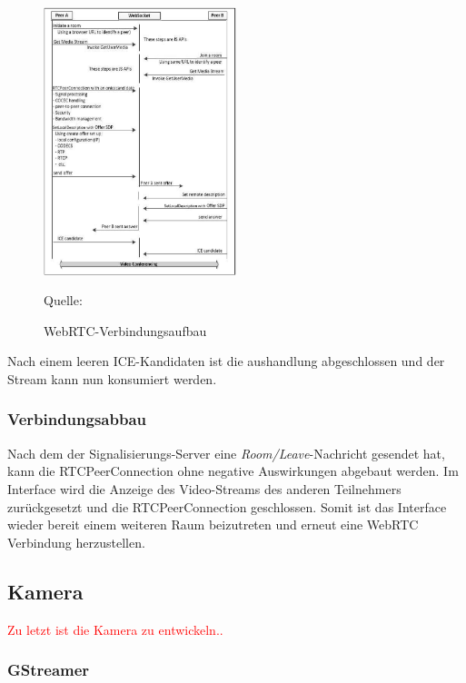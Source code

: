 \documentclass{article}
\newcommand{\figuresource}[1]{
	\begin{center}Quelle: #1\end{center}
}
\begin{document}
\begin{onecolumn}

\begin{figure}[ht]
	\includegraphics[width=0.5\textwidth]{cited-webrtc-connection-establishment}
	\centering
	\caption[WebRTC-Verbindungsaufbau~\cite{WebRTC}]{WebRTC-Verbindungsaufbau}
	\figuresource{\cite{WebRTC}}
\end{figure}

Nach einem leeren ICE-Kandidaten ist die aushandlung abgeschlossen und der
Stream kann nun konsumiert werden.

\subsubsection{Verbindungsabbau}

Nach dem der Signalisierungs-Server eine \textit{Room/Leave}-Nachricht gesendet
hat, kann die RTCPeerConnection ohne negative Auswirkungen abgebaut werden. Im
Interface wird die Anzeige des Video-Streams des anderen Teilnehmers
zurückgesetzt und die RTCPeerConnection geschlossen. Somit ist das Interface
wieder bereit einem weiteren Raum beizutreten und erneut eine WebRTC Verbindung
herzustellen.


\subsection{Kamera}

\textcolor{red}{Zu letzt ist die Kamera zu entwickeln..}

\subsubsection{GStreamer}


\end{onecolumn}
\end{document}
